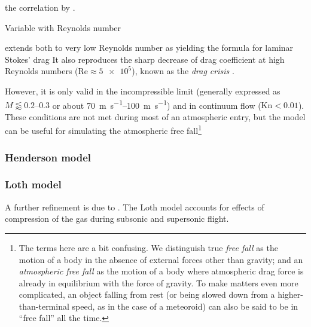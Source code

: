             the correlation by \citet{morrison2016}.

            Variable with Reynolds number

            extends both to very low Reynolds number as
            yielding the formula for laminar Stokes' drag
            It also reproduces the sharp decrease of drag coefficient at high Reynolds
            numbers ($\mathrm{Re} \approx \num{5e5}$), known as the \emph{drag crisis} \cite{???}.


            However, it is only valid in the incompressible limit
            (generally expressed as $M \lessapprox \numrange{0.2}{0.3}$ or
            about \SIrange{70}{100}{\metre\per\second}) and in continuum flow ($\mathrm{Kn} < \num{0.01}$).
            These conditions are not met during most of an atmospheric entry,
            but the model can be useful for simulating the atmospheric free
            fall\footnote{The terms here are a bit confusing. We distinguish true \emph{free fall} as
            the motion of a body in the absence of external forces other than gravity; and an \emph{atmospheric free fall}
            as the motion of a body where atmospheric drag force is already in equilibrium
            with the force of gravity. To make matters even more complicated, an object falling from rest
            (or being slowed down from a higher-than-terminal speed, as in the case of a meteoroid)
            can also be said to be in ``free fall'' all the time.}

        \subsubsection{Henderson model} \label{fdmH}

        \subsubsection{Loth model} \label{fdmL}
            A further refinement is due to \cite{loth???}.
            The Loth model accounts for effects of compression of the gas
            during subsonic and supersonic flight.

